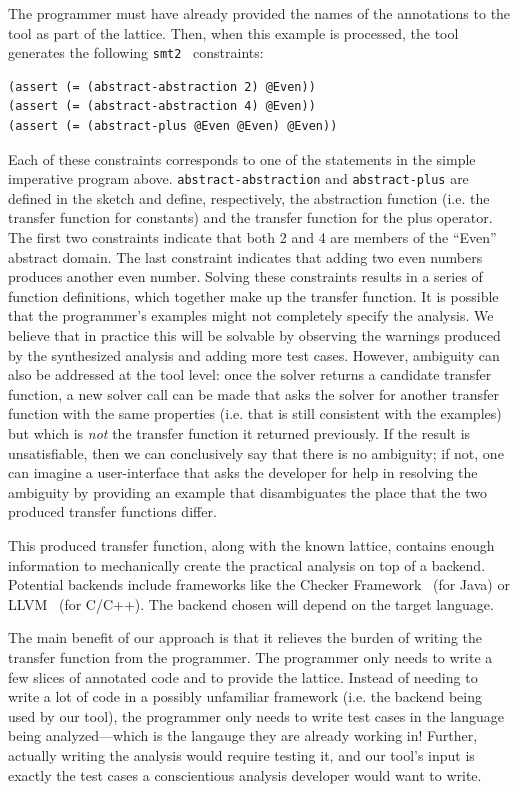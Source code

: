 \documentclass[10pt,conference]{IEEEtran}
\begin{document}
The programmer must have already provided the names of the annotations
to the tool as part of the lattice.
Then, when this example is processed, the tool generates
the following \lstinline{smt2}~\cite{smt2} constraints:

\begin{lstlisting}
(assert (= (abstract-abstraction 2) @Even))
(assert (= (abstract-abstraction 4) @Even))
(assert (= (abstract-plus @Even @Even) @Even))
\end{lstlisting}

Each of these constraints corresponds to one of the statements in the
simple imperative program above. \lstinline{abstract-abstraction}
and \lstinline{abstract-plus} are defined in the sketch and define,
respectively, the abstraction function (i.e. the transfer function
for constants) and the transfer function for the plus operator.
The first two constraints indicate that both 2 and 4 are members of
the ``Even'' abstract domain. The last constraint indicates that
adding two even numbers produces another even number. Solving these
constraints results in a series of function definitions, which together
make up the transfer function. It is possible that the programmer's
examples might not completely specify the analysis. We believe that in
practice this will be solvable by observing the warnings produced by
the synthesized analysis and adding more test cases. However, ambiguity
can also be addressed at the tool level: once the solver returns a
candidate transfer function, a new solver call can be made that asks
the solver for another transfer function with the same properties (i.e.
that is still consistent with the examples) but which is \emph{not} the
transfer function it returned previously. If the result is unsatisfiable,
then we can conclusively say that there is no ambiguity; if not, one
can imagine a user-interface that asks the developer for help in
resolving the ambiguity by providing an example that disambiguates the
place that the two produced transfer functions differ.

This produced transfer function, along with the known lattice,
contains enough information to mechanically create the practical
analysis on top of a backend. Potential backends include frameworks like the
Checker Framework~\cite{checker-framework} (for Java)
or LLVM~\cite{lattner04:_llvm} (for C/C++). The backend chosen will
depend on the target language.

The main benefit of our approach is that it relieves the burden of
writing the transfer function from the programmer. The programmer
only needs to write a few slices of annotated code and to provide
the lattice. Instead of
needing to write a lot of code in a possibly unfamiliar framework
(i.e. the backend being used by our tool), the programmer only needs to
write test cases in the language being analyzed---which is the langauge
they are already working in! Further, actually writing the analysis
would require testing it, and our tool's input is exactly the test
cases a conscientious analysis developer would want to write.
\end{document}
